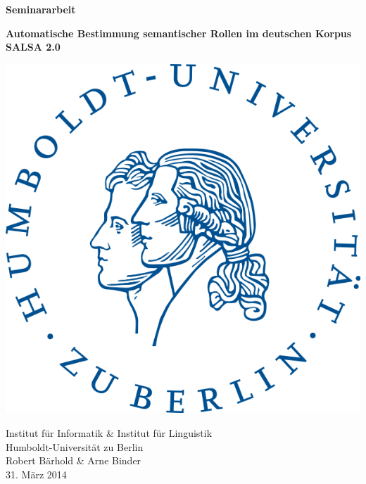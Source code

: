 \documentclass[12pt]{article}
\begin{document}
\begin{center}
\thispagestyle{empty}
	
	\vspace*{\fill}
	
	\Huge{\textbf{Seminararbeit}}\\
	\vspace{1.5cm}
	
	\Large{\textbf{Automatische Bestimmung semantischer Rollen im deutschen
	Korpus SALSA 2.0}}\\
	\vspace{1cm}
		
	\includegraphics[scale=0.3]{images/logo_hu.png}
	\vspace{1cm}

	\begin{Large}
		Institut für Informatik \& Institut für Linguistik\\
		Humboldt-Universität zu Berlin\\
		\vspace{1.5cm}
		Robert Bärhold \& Arne Binder \\
		31. März 2014 \\
		\vspace{1cm}
		

\end{Large}
\end{center}
\end{document}
